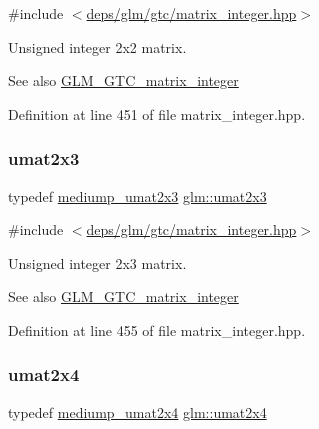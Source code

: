 {\ttfamily \#include $<$\hyperlink{matrix__integer_8hpp}{deps/glm/gtc/matrix\+\_\+integer.\+hpp}$>$}

Unsigned integer 2x2 matrix. \begin{DoxySeeAlso}{See also}
\hyperlink{group__gtc__matrix__integer}{G\+L\+M\+\_\+\+G\+T\+C\+\_\+matrix\+\_\+integer} 
\end{DoxySeeAlso}


Definition at line 451 of file matrix\+\_\+integer.\+hpp.

\mbox{\label{group__gtc__matrix__integer_ga890ae28f9230794138b2c89f44ce3376}} 
\subsubsection{\texorpdfstring{umat2x3}{umat2x3}}
{\footnotesize\ttfamily typedef \hyperlink{group__gtc__matrix__integer_ga15d2790e10b27b145cd748abffde8968}{mediump\+\_\+umat2x3} \hyperlink{group__gtc__matrix__integer_ga890ae28f9230794138b2c89f44ce3376}{glm\+::umat2x3}}



{\ttfamily \#include $<$\hyperlink{matrix__integer_8hpp}{deps/glm/gtc/matrix\+\_\+integer.\+hpp}$>$}

Unsigned integer 2x3 matrix. \begin{DoxySeeAlso}{See also}
\hyperlink{group__gtc__matrix__integer}{G\+L\+M\+\_\+\+G\+T\+C\+\_\+matrix\+\_\+integer} 
\end{DoxySeeAlso}


Definition at line 455 of file matrix\+\_\+integer.\+hpp.

\mbox{\label{group__gtc__matrix__integer_ga3b23b164240cf4dfb429776da7be9d88}} 
\subsubsection{\texorpdfstring{umat2x4}{umat2x4}}
{\footnotesize\ttfamily typedef \hyperlink{group__gtc__matrix__integer_gae060f3b73abab278da912329a0a221bc}{mediump\+\_\+umat2x4} \hyperlink{group__gtc__matrix__integer_ga3b23b164240cf4dfb429776da7be9d88}{glm\+::umat2x4}}



